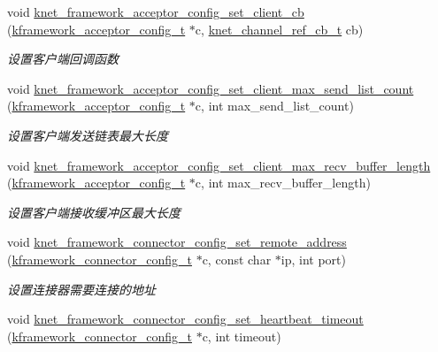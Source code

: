 \begin{DoxyCompactItemize}
void \hyperlink{a00104_ga03a86f8b8fc13e6fb8f1ca75e7f14d7a_ga03a86f8b8fc13e6fb8f1ca75e7f14d7a}{knet\+\_\+framework\+\_\+acceptor\+\_\+config\+\_\+set\+\_\+client\+\_\+cb} (\hyperlink{a00051_a39c993eb450173e4fde04498d757f9b6_a39c993eb450173e4fde04498d757f9b6}{kframework\+\_\+acceptor\+\_\+config\+\_\+t} $\ast$c, \hyperlink{a00051_a8a7d96123ef4565c6d08fe58a10476a9_a8a7d96123ef4565c6d08fe58a10476a9}{knet\+\_\+channel\+\_\+ref\+\_\+cb\+\_\+t} cb)
\begin{DoxyCompactList}\small\item\em 设置客户端回调函数 \end{DoxyCompactList}\item 
void \hyperlink{a00104_ga23b21427272c85b9730304add2cbd054_ga23b21427272c85b9730304add2cbd054}{knet\+\_\+framework\+\_\+acceptor\+\_\+config\+\_\+set\+\_\+client\+\_\+max\+\_\+send\+\_\+list\+\_\+count} (\hyperlink{a00051_a39c993eb450173e4fde04498d757f9b6_a39c993eb450173e4fde04498d757f9b6}{kframework\+\_\+acceptor\+\_\+config\+\_\+t} $\ast$c, int max\+\_\+send\+\_\+list\+\_\+count)
\begin{DoxyCompactList}\small\item\em 设置客户端发送链表最大长度 \end{DoxyCompactList}\item 
void \hyperlink{a00104_ga44e90ae8fe6b358dbcd77c447ead94fc_ga44e90ae8fe6b358dbcd77c447ead94fc}{knet\+\_\+framework\+\_\+acceptor\+\_\+config\+\_\+set\+\_\+client\+\_\+max\+\_\+recv\+\_\+buffer\+\_\+length} (\hyperlink{a00051_a39c993eb450173e4fde04498d757f9b6_a39c993eb450173e4fde04498d757f9b6}{kframework\+\_\+acceptor\+\_\+config\+\_\+t} $\ast$c, int max\+\_\+recv\+\_\+buffer\+\_\+length)
\begin{DoxyCompactList}\small\item\em 设置客户端接收缓冲区最大长度 \end{DoxyCompactList}\item 
void \hyperlink{a00104_gae677441ee9bcc61da7c7728ce3ae773e_gae677441ee9bcc61da7c7728ce3ae773e}{knet\+\_\+framework\+\_\+connector\+\_\+config\+\_\+set\+\_\+remote\+\_\+address} (\hyperlink{a00051_a44d3033eba5a4fd784a741700a7a2521_a44d3033eba5a4fd784a741700a7a2521}{kframework\+\_\+connector\+\_\+config\+\_\+t} $\ast$c, const char $\ast$ip, int port)
\begin{DoxyCompactList}\small\item\em 设置连接器需要连接的地址 \end{DoxyCompactList}\item 
void \hyperlink{a00104_ga186f2fb032c5b2350e990c63b5aa628e_ga186f2fb032c5b2350e990c63b5aa628e}{knet\+\_\+framework\+\_\+connector\+\_\+config\+\_\+set\+\_\+heartbeat\+\_\+timeout} (\hyperlink{a00051_a44d3033eba5a4fd784a741700a7a2521_a44d3033eba5a4fd784a741700a7a2521}{kframework\+\_\+connector\+\_\+config\+\_\+t} $\ast$c, int timeout)

\end{DoxyCompactItemize}
